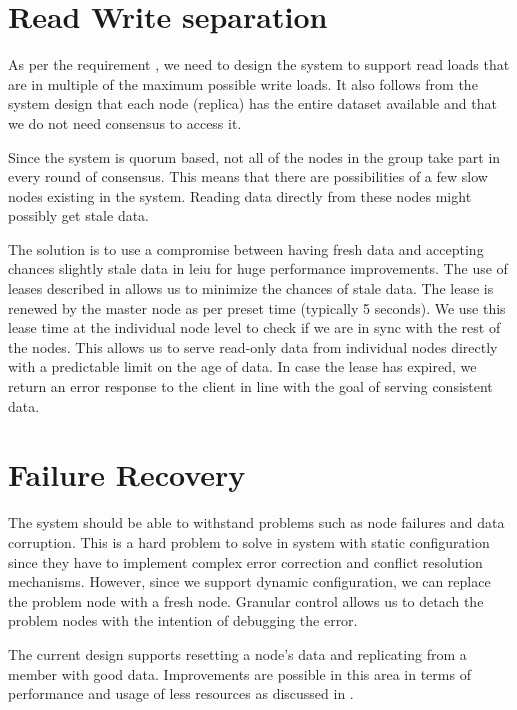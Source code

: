 \section{Read Write separation}

As per the requirement , we need to design the
system to support read loads that are in multiple of the maximum possible write
loads. It also follows from the system design that each node (replica) has the
entire dataset available and that we do not need consensus to access it. 

Since the system is quorum based, not all of the nodes in the group take part
in every round of consensus. This means that there are possibilities of a few 
slow nodes existing in the system. Reading data directly from these nodes might
possibly get stale data.

The solution is to use a compromise between having fresh data and accepting 
chances slightly stale data in leiu for huge performance improvements. The
use of leases described in  allows us to minimize the
chances of stale data. The lease is renewed by the master node as per preset 
time (typically 5 seconds). We use this lease time at the individual node level 
to check if we are in sync with the rest of the nodes. This allows us to serve 
read-only data from individual nodes directly with a predictable limit on the 
age of data. In case the lease has expired, we return an error response to
the client in line with the goal of serving consistent data.

\section{Failure Recovery}

The system should be able to withstand problems such as node failures and data
corruption. This is a hard problem to solve in system with static configuration
since they have to implement complex error correction and conflict resolution
mechanisms. However, since we support dynamic configuration, we can replace
the problem node with a fresh node. Granular control allows us to detach the
problem nodes with the intention of debugging the error.

The current design supports resetting a node's data and replicating from
a member with good data. Improvements are possible in this area in terms of
performance and usage of less resources as discussed in
.







